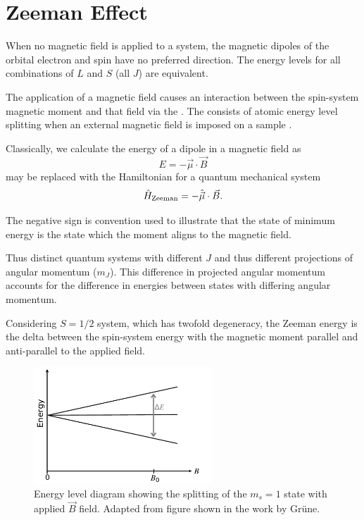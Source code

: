 \section{Zeeman Effect}\label{zeeman}
When no magnetic field is applied to a system, the magnetic dipoles of the orbital electron and spin have no preferred direction. 
The energy levels for all combinations of $L$ and $S$ (all $J$) are equivalent. 

The application of a magnetic field causes an interaction between the spin-system magnetic moment and 
that field via the . 
The  consists of atomic energy level splitting when an external magnetic field is imposed on a sample \cite{Nabokov2002}. 

Classically, we calculate the energy of a dipole in a magnetic field as
\begin{equation}
    E = -\vec{\mu}\cdot\vec{B}
    \label{eq:dipole_energy_scalar_prod}
\end{equation}
may be replaced with the Hamiltonian for a quantum mechanical system 
\begin{equation}
    \hat{H}_{\ce{Zeeman}} = - \hat{\vec{\mu}}\cdot \vec{B}. 
    \label{eq:}
\end{equation}

The negative sign is convention used to illustrate that the state of minimum energy is the state which the moment aligns to the magnetic field.

Thus distinct quantum systems with different $J$ and thus different projections of angular momentum ($m_J$). This difference in projected angular momentum accounts for the difference in energies between states with differing angular momentum.  

Considering $S=1/2$ system, which has twofold degeneracy, the Zeeman energy is the delta between the spin-system energy with the magnetic moment parallel and anti-parallel to the applied field. 


\begin{figure}[H]
    \begin{center}
        \includegraphics[width=0.6\textwidth]{figures/Zeeman.pdf}
    \end{center}
    \caption{Energy level diagram showing the splitting of the $m_s = 1$ state with applied $\vec{B}$ field. Adapted from figure shown in the work by Gr\"{u}ne.}\label{fig:}
\end{figure}

